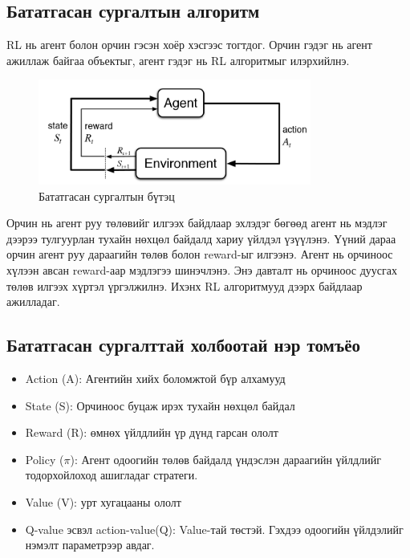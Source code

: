 \documentclass[12pt,A4]{report}
\begin{document}
\subsection{Бататгасан сургалтын алгоритм}

RL нь агент болон орчин гэсэн хоёр хэсгээс тогтдог. Орчин гэдэг нь агент ажиллаж байгаа объектыг, агент гэдэг нь RL алгоритмыг илэрхийлнэ.

\begin{figure}[H]
\centering
\includegraphics[width=0.8\textwidth]{./images/rl}
\caption{Бататгасан сургалтын бүтэц}
\end{figure}

Орчин нь агент руу төлөвийг илгээх байдлаар эхлэдэг бөгөөд агент нь мэдлэг дээрээ тулгуурлан тухайн нөхцөл байдалд хариу үйлдэл үзүүлэнэ. Үүний дараа орчин агент руу дараагийн төлөв болон reward-ыг илгээнэ. Агент нь орчиноос хүлээн авсан reward-аар мэдлэгээ шинэчлэнэ. Энэ давталт нь орчиноос дуусгах төлөв илгээх хүртэл үргэлжилнэ. Ихэнх RL алгоритмууд дээрх байдлаар ажилладаг.

\subsection{Бататгасан сургалттай холбоотай нэр томъёо}

\begin{itemize}
	\item Action (A): Агентийн хийх боломжтой бүр алхамууд
	\item State (S): Орчиноос буцаж ирэх тухайн нөхцөл байдал
	\item Reward (R): өмнөх үйлдлийн үр дүнд гарсан ололт
	\item Policy (\(\pi\)): Агент одоогийн төлөв байдалд үндэслэн дараагийн үйлдлийг тодорхойлоход ашигладаг стратеги. 
	\item Value (V): урт хугацааны ололт
	\item Q-value эсвэл action-value(Q): Value-тай төстэй. Гэхдээ одоогийн үйлдэлийг нэмэлт параметрээр авдаг.
\end{itemize}
\end{document}
